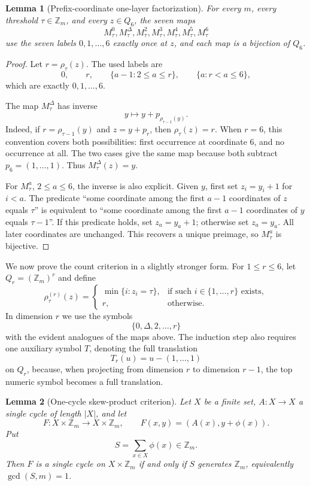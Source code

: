 \documentclass[11pt]{article}
\newtheorem{lemma}{Lemma}
\theoremstyle{definition}
\begin{document}
\begin{lemma}[Prefix-coordinate one-layer factorization]\label{lem:prefix-layer}
For every \(m\), every threshold \(\tau\in\mathbb Z_m\), and every \(z\in Q_6\), the seven maps
\[
M_\tau^0,M_\tau^\Delta,M_\tau^2,M_\tau^3,M_\tau^4,M_\tau^5,M_\tau^6
\]
use the seven labels \(0,1,\ldots,6\) exactly once at \(z\), and each map is a bijection of \(Q_6\).
\end{lemma}

\begin{proof}
Let \(r=\rho_\tau(z)\).  The used labels are
\[
0,
\qquad r,
\qquad \{a-1:2\le a\le r\},
\qquad \{a:r<a\le6\},
\]
which are exactly \(0,1,\ldots,6\).

The map \(M_\tau^\Delta\) has inverse
\[
y\longmapsto y+p_{\rho_{\tau-1}(y)}.
\]
Indeed, if \(r=\rho_{\tau-1}(y)\) and \(z=y+p_r\), then \(\rho_\tau(z)=r\).  When \(r=6\), this convention covers both possibilities: first occurrence at coordinate \(6\), and no occurrence at all.  The two cases give the same map because both subtract \(p_6=(1,\ldots,1)\).  Thus \(M_\tau^\Delta(z)=y\).

For \(M_\tau^a\), \(2\le a\le6\), the inverse is also explicit.  Given \(y\), first set
\(z_i=y_i+1\) for \(i<a\).  The predicate ``some coordinate among the first \(a-1\) coordinates of
\(z\) equals \(\tau\)'' is equivalent to ``some coordinate among the first \(a-1\) coordinates of \(y\)
equals \(\tau-1\)''.  If this predicate holds, set \(z_a=y_a+1\); otherwise set \(z_a=y_a\).  All later
coordinates are unchanged.  This recovers a unique preimage, so \(M_\tau^a\) is bijective.
\end{proof}

We now prove the count criterion in a slightly stronger form.  For \(1\le r\le6\), let \(Q_r=(\mathbb Z_m)^r\) and define
\[
\rho^{(r)}_\tau(z)=
\begin{cases}
\min\{i:z_i=\tau\},&\text{if such }i\in\{1,\ldots,r\}\text{ exists},\\
r,&\text{otherwise}.
\end{cases}
\]
In dimension \(r\) we use the symbols
\[
\{0,\Delta,2,\ldots,r\}
\]
with the evident analogues of the maps above.  The induction step also requires one auxiliary symbol \(T\), denoting the full translation
\[
T_r(u)=u-(1,\ldots,1)
\]
on \(Q_r\), because, when projecting from dimension \(r\) to dimension \(r-1\), the top numeric symbol becomes a full translation.

\begin{lemma}[One-cycle skew-product criterion]\label{lem:skew-product}
Let \(X\) be a finite set, \(A:X\to X\) a single cycle of length \(|X|\), and let
\[
F:X\times\mathbb Z_m\to X\times\mathbb Z_m,
\qquad F(x,y)=(A(x),y+\phi(x)).
\]
Put
\[
S=\sum_{x\in X}\phi(x)\in\mathbb Z_m.
\]
Then \(F\) is a single cycle on \(X\times\mathbb Z_m\) if and only if \(S\) generates
\(\mathbb Z_m\), equivalently \(\gcd(S,m)=1\).
\end{lemma}
\end{document}

